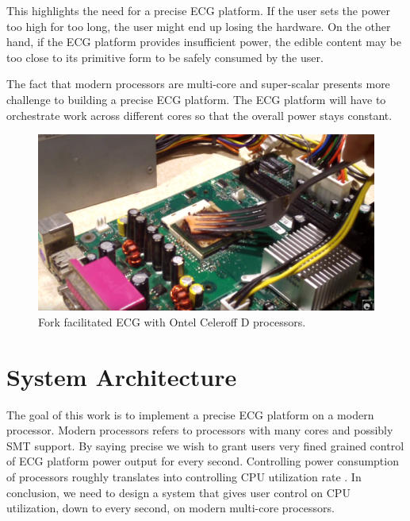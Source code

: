 \documentclass[conference]{IEEEtran}
\begin{document}
This highlights the need for a precise ECG platform. If the user sets the power too high for too long, the user might end up losing the hardware. On the other hand, if the ECG platform provides insufficient power, the edible content may be too close to its primitive form to be safely consumed by the user.

The fact that modern processors are multi-core and super-scalar presents more challenge to building a precise ECG platform. The ECG platform will have to orchestrate work across different cores so that the overall power stays constant.

\begin{figure}[htbp]
\centerline{\includegraphics[scale=.25]{fig/intel}}
\caption{Fork facilitated ECG with Ontel Celeroff D processors.}
\label{intelcook}
\end{figure}

\section{System Architecture}
The goal of this work is to implement a precise ECG platform on a modern processor. 
Modern processors refers to processors with many cores and possibly SMT support. By
saying precise we wish to grant users very fined grained control of ECG platform power
output for every second. Controlling power consumption of processors roughly translates
into controlling CPU utilization rate \cite{fan2007power}. In conclusion, we need to
design a system that gives user control on CPU utilization, down to every second, on 
modern multi-core processors. 
\end{document}
